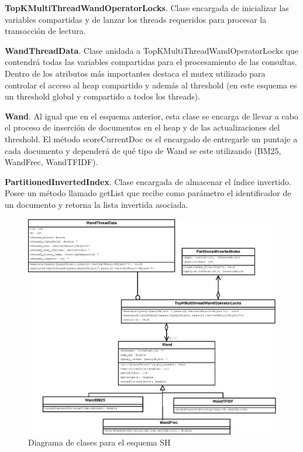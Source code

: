 \begin{list}{}{}
	\item \textbf{TopKMultiThreadWandOperatorLocks}. Clase encargada de inicializar las variables compartidas y de lanzar los threads requeridos para procesar la transacción de lectura.
	
	\item \textbf{WandThreadData}. Clase anidada a TopKMultiThreadWandOperatorLocks que contendrá todas las variables compartidas para el procesamiento de las consultas. Dentro de los atributos más importantes destaca el mutex utilizado para controlar el acceso al heap compartido y además al threshold (en este esquema es un threshold global y compartido a todos los threads).
	
	\item \textbf{Wand}. Al igual que en el esquema anterior, esta clase se encarga de llevar a cabo el proceso de inserción de documentos en el heap y de las actualizaciones del threshold. El método scoreCurrentDoc es el encargado de entregarle un puntaje a cada documento y dependerá de qué tipo de Wand se este utilizando (BM25, WandFrec, WandTFIDF). 

	\item \textbf{PartitionedInvertedIndex}. Clase encargada de almacenar el índice invertido. Posee un método llamado getList que recibe como parámetro el identificador de un documento y retorna la lista invertida asociada. 

\end{list}

\begin{figure}[!ht]
\centering
\includegraphics[scale=.75]{images/TopKMultiThreadWandOperatorLocks.eps}
\caption{Diagrama de clases para el esquema SH}
\label{fig:TopKMultiThreadWandOperatorLocks}
\end{figure}
